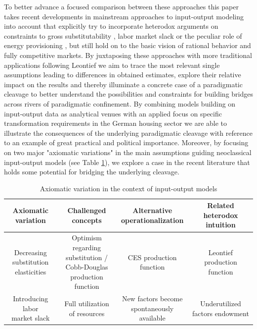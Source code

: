 \documentclass{article}
\begin{document}
To better advance a focused comparison between these approaches this paper takes recent developments in mainstream approaches to input-output modeling into account \citep{BF2019,Baqaee.2021,BF2022} that explicitly try to incorporate heterodox arguments on constraints to gross substitutability \citep[e.g.][]{davidson1994}, labor market slack \citep[e.g.][]{lavoie2014} or the peculiar role of energy provisioning \citep[e.g.][]{Keen.2018}, but still hold on to the basic vision of rational behavior and fully competitive markets. 
By juxtaposing these approaches with more traditional applications following Leontief we aim to trace the most relevant single assumptions leading to differences in obtained estimates, explore their relative impact on the results and thereby illuminate a concrete case of a paradigmatic cleavage to better understand the possibilities and constraints for building bridges across rivers of paradigmatic confinement. 
By combining models building on input-output data as analytical venues with an applied focus on specific transformation requirements in the German housing sector \citep[largely based on][]{Hornykewycz.2025} we are able to illustrate the consequences of the underlying paradigmatic cleavage with reference to an example of great practical and political importance. Moreover, by focusing on two major "axiomatic variations" \citep{Kapeller.2013} in the main assumptions guiding neoclassical input-output models (see Table \ref{tab:overview}), we explore a case in the recent literature that holds some potential for bridging the underlying cleavage.

\begin{table}
\label{tab:overview}
\centering
\scriptsize
\begin{tabular}{|c|c|c|c|} 
\hline
\textbf{Axiomatic variation} & \textbf{Challenged concepts} & \makecell{\textbf{Alternative}\\ \textbf{operationalization}} & \textbf{Related heterodox intuition}  \\ 
\hline
\makecell{Decreasing substitution\\elasticities} & \makecell{Optimism regarding\\substitution / Cobb-Douglas\\production function} & \makecell{CES production\\function} & Leontief production function       \\ 
\hline
\makecell{Introducing labor\\market slack} & Full utilization of resources & \makecell{New factors become\\spontaneously available} & Underutilized factors endowment \\ 
\hline
\end{tabular}
\caption{Axiomatic variation in the context of input-output models}

\end{table}
\end{document}
